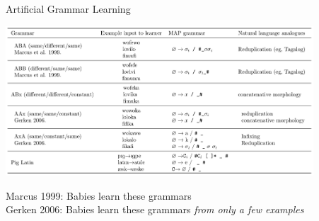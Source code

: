 \documentclass{beamer}
\begin{document}
\begin{frame}{Artificial Grammar Learning}

  \begin{centering}
   \includegraphics[width = 11.5cm]{synthetic.png}
  \end{centering}

  Marcus 1999: Babies learn these grammars\\
  Gerken 2006: Babies learn these grammars \emph{from only a few examples}\\

\end{frame}
\end{document}
